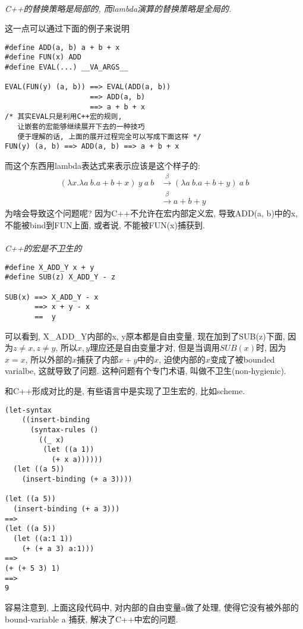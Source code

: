\documentclass{article}
\begin{document}
\paragraph{} \emph{C++的替换策略是局部的, 而lambda演算的替换策略是全局的.}

这一点可以通过下面的例子来说明
\begin{tcolorbox}
\begin{verbatim}
#define ADD(a, b) a + b + x
#define FUN(x) ADD
#define EVAL(...) __VA_ARGS__

EVAL(FUN(y) (a, b)) ==> EVAL(ADD(a, b)) 
                    ==> ADD(a, b) 
                    ==> a + b + x
/* 其实EVAL只是利用C++宏的规则, 
   让嵌套的宏能够继续展开下去的一种技巧
   便于理解的话, 上面的展开过程完全可以写成下面这样 */
FUN(y) (a, b) ==> ADD(a, b) ==> a + b + x
\end{verbatim}
\end{tcolorbox}
而这个东西用lambda表达式来表示应该是这个样子的:
\begin{align*}
  (\lambda x . \lambda a\ b. a + b + x)\ y\ a\ b &\xrightarrow{\beta} (\lambda a\ b . a + b + y)\ a\ b \\
  &\xrightarrow{\beta} a + b + y
\end{align*}
为啥会导致这个问题呢? 因为C++不允许在宏内部定义宏, 导致ADD(a, b)中的x, 不能被bind到FUN上面, 或者说, 不能被FUN(x)捕获到.

\paragraph{} \emph{C++的宏是不卫生的}
\begin{tcolorbox}
\begin{verbatim}
#define X_ADD_Y x + y
#define SUB(z) X_ADD_Y - z

SUB(x) ==> X_ADD_Y - x 
       ==> x + y - x 
       ==  y
\end{verbatim}
\end{tcolorbox}
可以看到, X\_ADD\_Y内部的x, y原本都是自由变量, 现在加到了SUB(z)下面, 因为$z\not=x, z\not=y$, 所以$x, y$理应还是自由变量才对, 但是当调用$SUB(x)$时, 因为$x = x$, 所以外部的$x$捕获了内部$x + y$中的$x$, 迫使内部的$x$变成了被bounded varialbe, 这就导致了问题. 这种问题有个专门术语, 叫做不卫生(non-hygienic).

和C++形成对比的是, 有些语言中是实现了卫生宏的, 比如scheme.
\begin{verbatim}
(let-syntax
    ((insert-binding
      (syntax-rules ()
        ((_ x)
         (let ((a 1))
           (+ x a))))))
  (let ((a 5))
    (insert-binding (+ a 3))))

(let ((a 5))
  (insert-binding (+ a 3)))
==>
(let ((a 5))
  (let ((a:1 1))
    (+ (+ a 3) a:1)))
==>
(+ (+ 5 3) 1)
==>
9
\end{verbatim}
容易注意到, 上面这段代码中, 对内部的自由变量a做了处理, 使得它没有被外部的bound-variable a 捕获, 解决了C++中宏的问题.
\end{document}
